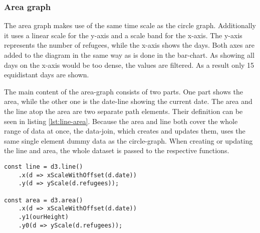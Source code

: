\subsubsection{Area graph}

The area graph makes use of the same time scale as the circle graph. Additionally it uses a linear scale for the y-axis and a scale band for the x-axis. The y-axis represents the number of refugees, while the x-axis shows the days. Both axes are added to the diagram in the same way as is done in the bar-chart. As showing all days on the x-axis would be too dense, the values are filtered. As a result only 15 equidistant days are shown.

The main content of the area-graph consists of two parts. One part shows the area, while the other one is the date-line showing the current date. The area and the line atop the area are two separate path elements. Their definition can be seen in listing \ref{lst:line-area}. Because the area and line both cover the whole range of data at once, the data-join, which creates and updates them, uses the same single element dummy data as the circle-graph. When creating or updating the line and area, the whole dataset is passed to the respective functions.

\begin{minipage}{0.9\linewidth}
    \begin{lstlisting}[style=htmlcssjs, captionpos=b, caption={The first constant defines the function for creating the top-line of the area graph. Therefore the functions for x and y values are defined. When the function is called and a data-set is provided, by calling \texttt{line(data)}, the line is constructed by calculating the according x and y positions for every data-point. Defining and creating the area works in similar fashion. Yet there are two y-positions for each x-position. This allows for a huge variety of shapes. Yet it is not possible to create concave ends on the right or left side of the diagram, assuming left and rigth are aligned with the orientation of the x-axis. (Section from \ref{app:area-graph} lines 111ff)}, label={lst:line-area}]
const line = d3.line()
    .x(d => xScaleWithOffset(d.date))
    .y(d => yScale(d.refugees));

const area = d3.area()
    .x(d => xScaleWithOffset(d.date))
    .y1(ourHeight)
    .y0(d => yScale(d.refugees));
    \end{lstlisting}
\end{minipage}

